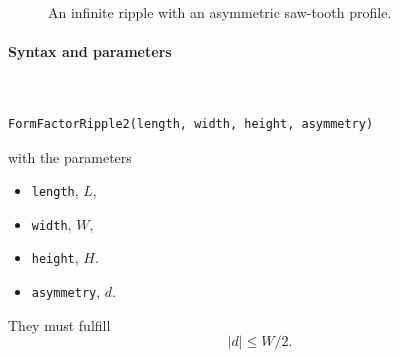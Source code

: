 \begin{figure}[H]
\hfill
{}
\hfill
{}
\hfill
{}
\hfill
\caption{An infinite ripple with an asymmetric saw-tooth profile.}
\end{figure}

\FloatBarrier

\paragraph{Syntax and parameters}\strut\\[-2ex plus .2ex minus .2ex]
\begin{lstlisting}[language=python, style=eclipseboxed,numbers=none,nolol]
  FormFactorRipple2(length, width, height, asymmetry)
\end{lstlisting}
with the parameters
\begin{itemize}
\item \texttt{length}, $L$, 
\item \texttt{width}, $W$, 
\item \texttt{height}, $H$. 
\item \texttt{asymmetry}, $d$. 
\end{itemize}
They must fulfill
\begin{displaymath}
  |d| \le W/2.
\end{displaymath}


